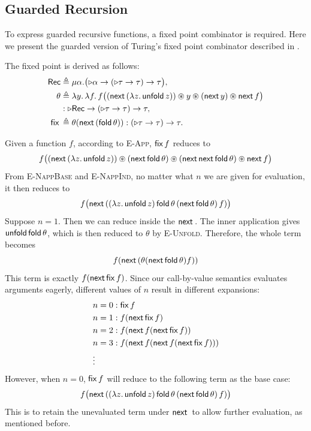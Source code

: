 \subsection{Guarded Recursion}
To express guarded recursive functions, a fixed point combinator is required. Here we present the guarded version of Turing's fixed point combinator 
described in \citep{cloustonGuardedLambdaCalculusProgramming2017a}.

\begin{defn} The fixed point is derived as follows:
\begin{align*}
  \mathsf{Rec}
    &\triangleq
      \mu\alpha.
      \bigl(\triangleright\alpha
        \to(\triangleright\tau\to\tau)\to\tau\bigr), \\
  \theta
    &\triangleq
      \lambda y.\,\lambda f.\,
        f\bigl(
          (\mathsf{next}\,(\lambda z.\,\mathsf{unfold}\, z))
          \circledast y
          \circledast(\mathsf{next}\, y)
          \circledast \mathsf{next}\, f
        \bigr) \\
    &: \triangleright\mathsf{Rec}
       \to(\triangleright\tau\to\tau)\to\tau, \\
  \mathsf{fix}\, &\triangleq \theta (\mathsf{next}\,(\mathsf{fold}\,\theta))
    :(\triangleright\tau\to\tau)\to\tau.
\end{align*} 
\end{defn}

Given a function $f$, according to \textsc{E-App}, $\mathsf{fix}\, f$ reduces to
\[
          f\bigl(
            (\mathsf{next}\,(\lambda z.\,\mathsf{unfold}\, z))
            \circledast (\mathsf{next}\, \mathsf{fold}\, \theta)
            \circledast(\mathsf{next}\, \mathsf{next}\, \mathsf{fold}\, \theta)
            \circledast \mathsf{next}\, f
          \bigr) 
\]
From \textsc{E-NappBase} and \textsc{E-NappInd}, no matter what $n$ we are given for evaluation, it then reduces to 
\[
  f\bigl(
            \mathsf{next}\,((\lambda z.\,\mathsf{unfold}\, z) \,
            \mathsf{fold}\, \theta \,
            (\mathsf{next}\, \mathsf{fold}\, \theta)\,f)
          \bigr)
\]
Suppose $n=1$. Then we can reduce inside the $\mathsf{next}\,$. 
The inner application gives $\mathsf{unfold}\, \mathsf{fold}\, \theta$, which is then reduced to $\theta$ by \textsc{E-Unfold}.
Therefore, the whole term becomes 
\[
  f (\mathsf{next}\, (\theta(\mathsf{next}\, \mathsf{fold}\, \theta)f)) 
\]
This term is exactly $f (\mathsf{next}\, \mathsf{fix}\, f)$. 
Since our call-by-value semantics evaluates arguments eagerly, different values of $n$ result in different expansions:
\begin{align*}
  &n = 0: \mathsf{fix}\, f  \\
  &n = 1: f (\mathsf{next}\, \mathsf{fix}\, f)   \\
  &n = 2: f (\mathsf{next}\, f (\mathsf{next}\,\mathsf{fix}\, f)) \\
  &n = 3: f (\mathsf{next}\, f (\mathsf{next}\, f (\mathsf{next}\, \mathsf{fix}\, f))) \\
  &\vdots
\end{align*}
However, when $n = 0$, $\mathsf{fix}\, f$ will reduce to the following term as the base case: 
\[  f\bigl(
            \mathsf{next}\,((\lambda z.\,\mathsf{unfold}\, z) \,
            \mathsf{fold}\, \theta \,
            (\mathsf{next}\, \mathsf{fold}\, \theta)\,f)
          \bigr)\]
This is to retain the unevaluated term under $\mathsf{next}\,$ to allow further evaluation, as mentioned before.

